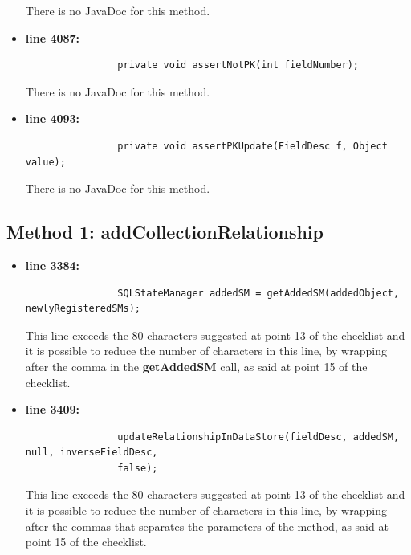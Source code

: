 \documentclass[18pt,oneside,a4paper, titlepage]{article}
\begin{document}
\begin{itemize}
				There is no JavaDoc for this method.
				\item \textbf{line 4087:} \begin{lstlisting}
				private void assertNotPK(int fieldNumber);
				\end{lstlisting}
				\vspace{0.1cm}
				
				There is no JavaDoc for this method.
				\item \textbf{line 4093:} \begin{lstlisting}
				private void assertPKUpdate(FieldDesc f, Object value);
				\end{lstlisting}
				\vspace{0.1cm}
				
				There is no JavaDoc for this method.
				
				
				
			\end{itemize}
			
		\subsection{Method 1: addCollectionRelationship}
			\begin{itemize}
				\item \textbf{line 3384:} \begin{lstlisting}
				SQLStateManager addedSM = getAddedSM(addedObject, newlyRegisteredSMs);
				\end{lstlisting}
				\vspace{0.1cm}
				This line exceeds the 80 characters suggested at point 13 of the checklist and it is possible to reduce the number of characters in this line, by wrapping after the comma in the \textbf{getAddedSM} call, as said at point 15 of the checklist.
				\item \textbf{line 3409:} \begin{lstlisting}
				updateRelationshipInDataStore(fieldDesc, addedSM, null, inverseFieldDesc,
				false);
				\end{lstlisting}
				\vspace{0.1cm}
				This line exceeds the 80 characters suggested at point 13 of the checklist and it is possible to reduce the number of characters in this line, by wrapping after the commas that separates the parameters of the method, as said at point 15 of the checklist.
			\end{itemize}
\end{document}
